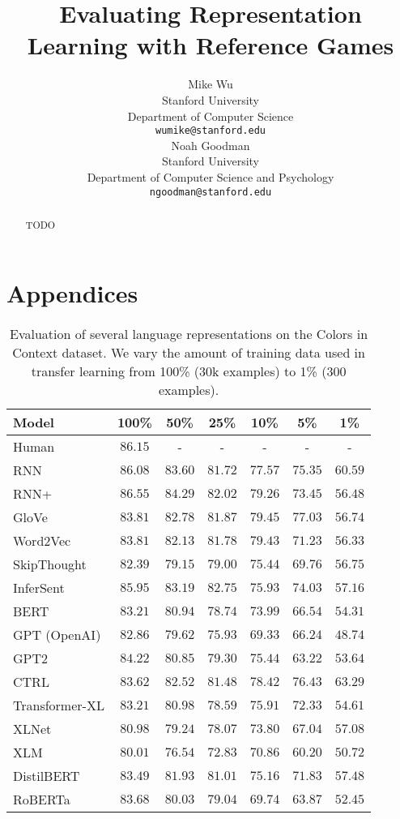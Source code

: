 \documentclass[11pt,a4paper]{article}
\title{Evaluating Representation Learning with Reference Games}
\author{Mike Wu \\
  Stanford University \\
  Department of Computer Science \\
  \texttt{wumike@stanford.edu} \\ \And
  Noah Goodman \\
  Stanford University \\
  Department of Computer Science and Psychology \\
  \texttt{ngoodman@stanford.edu} \\}
\date{}
\begin{document}
\maketitle
\begin{abstract}
TODO
\end{abstract}




\appendix

\section{Appendices}
\label{sec:appendix}

\begin{table*}[t!]
\centering
\begin{tabular}{lcccccc}
\hline
\textbf{Model} & \textbf{100\%} & \textbf{50\%} & \textbf{25\%} & \textbf{10\%} & \textbf{5\%} & \textbf{1\%} \\
\hline
Human & $86.15$ & - & - & - & - & - \\
\hline
RNN & $86.08$ & $83.60$ & $81.72$ & $77.57$ & $75.35$ & $60.59$ \\
RNN+ & $\mathbf{86.55}$ & $\mathbf{84.29}$ & $82.02$ & $79.26$ & $73.45$ & $56.48$ \\
GloVe & $83.81$ & $82.78$ & $81.87$ & $\mathbf{79.45}$ & $\mathbf{77.03}$ & $56.74$ \\
Word2Vec & $83.81$ & $82.13$ & $81.78$ & $79.43$ & $71.23$ & $56.33$ \\
SkipThought & $82.39$ & $79.15$ & $79.00$ & $75.44$ & $69.76$ & $56.75$ \\
InferSent & $85.95$ & $83.19$ & $\mathbf{82.75}$ & $75.93$ & $74.03$ & $57.16$ \\
BERT & $83.21$ & $80.94$ & $78.74$ & $73.99$ & $66.54$ & $54.31$ \\
GPT (OpenAI) & $82.86$ & $79.62$ & $75.93$ & $69.33$ & $66.24$ & $48.74$ \\
GPT2 & $84.22$ & $80.85$ & $79.30$ & $75.44$ & $63.22$ & $53.64$ \\
CTRL & $83.62$ & $82.52$ & $81.48$ & $78.42$ & $76.43$ & $\mathbf{63.29}$ \\
Transformer-XL & $83.21$ & $80.98$ & $78.59$ & $75.91$ & $72.33$ & $54.61$ \\
XLNet & $80.98$ & $79.24$ & $78.07$ & $73.80$ & $67.04$ & $57.08$ \\
XLM & $80.01$ & $76.54$ & $72.83$ & $70.86$ & $60.20$ & $50.72$ \\
DistilBERT & $83.49$ & $81.93$ & $81.01$ & $75.16$ & $71.83$ & $57.48$ \\
RoBERTa & $83.68$ & $80.03$ & $79.04$ & $69.74$ & $63.87$ & $52.45$ \\
\hline
\end{tabular}
\caption{\label{table:colors} Evaluation of several language representations on the Colors in Context dataset. We vary the amount of training data used in transfer learning from 100\% (30k examples) to 1\% (300 examples).}
\end{table*}
\end{document}
